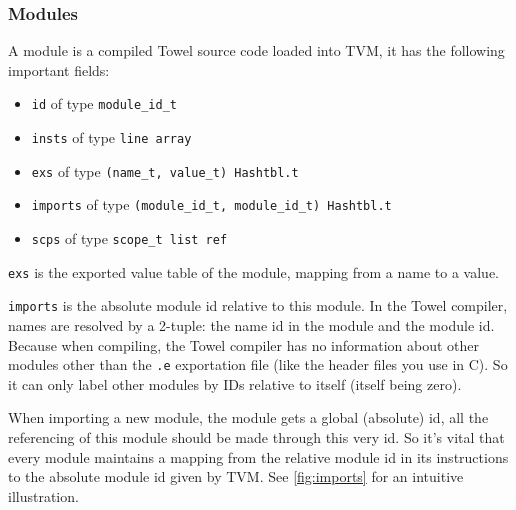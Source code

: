 \documentclass{article}
\begin{document}
\subsubsection{Modules}

A module is a compiled Towel source code loaded into TVM, it has the following important fields:
\begin{itemize}
\item \texttt{id} of type \texttt{module\_id\_t}
\item \texttt{insts} of type \texttt{line array}
\item \texttt{exs} of type \texttt{(name\_t, value\_t) Hashtbl.t}
\item \texttt{imports} of type \texttt{(module\_id\_t, module\_id\_t) Hashtbl.t}
\item \texttt{scps} of type \texttt{scope\_t list ref}
\end{itemize}

\texttt{exs} is the exported value table of the module, mapping from a name to a value.

\texttt{imports} is the absolute module id relative to this module. In the Towel compiler, names are resolved by a 2-tuple: the name id in the module and the module id. Because when compiling, the Towel compiler has no information about other modules other than the \texttt{.e} exportation file (like the header files you use in C). So it can only label other modules by IDs relative to itself (itself being zero).

When importing a new module, the module gets a global (absolute) id, all the referencing of this module should be made through this very id. So it's vital that every module maintains a mapping from the relative module id in its instructions to the absolute module id given by TVM. See \ref{fig:imports} for an intuitive illustration.
\end{document}
